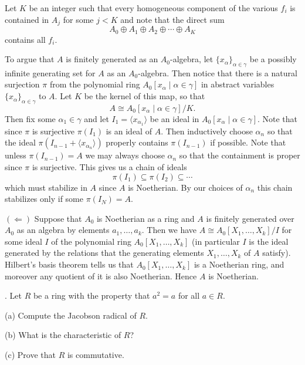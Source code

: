 \documentclass[11pt]{article}
\begin{document}
Let $K$ be an integer such that every homogeneous component of the various $f_i$ is contained in $A_j$ for some $j<K$ and note that the direct sum \[
A_0\oplus A_1\oplus A_2\oplus\cdots \oplus A_K
\]
contains all $f_i$. 


To argue that $A$ is finitely generated as an $A_0$-algebra, let $\{x_\alpha\}_{\alpha \in \gamma}$ be a possibly infinite generating set for $A$ as an $A_0$-algebra. Then notice that there is a natural surjection $\pi$ from the polynomial ring $A_0[x_\alpha \mid \alpha\in \gamma]$ in abstract variables $\{x_\alpha\}_{\alpha\in \gamma}$ to $A$. Let $K$ be the kernel of this map, so that \[
A \cong A_0[x_\alpha\mid \alpha\in \gamma]/ K.
\]
Then fix some $\alpha_1\in \gamma$ and let $I_1 = \langle x_{\alpha_1}\rangle$ be an ideal in $A_0[x_\alpha\mid \alpha\in \gamma]$. Note that since $\pi$ is surjective $\pi(I_1)$ is an ideal of $A$. Then inductively choose $\alpha_n$ so that the ideal $\pi(I_{n-1}+\langle x_{\alpha_n}\rangle)$ properly contains $\pi(I_{n-1})$ if possible. Note that unless $\pi(I_{n-1}) = A$ we may always choose $\alpha_{n}$ so that the containment is proper since $\pi$ is surjective. This gives us a chain of ideals \[
\pi(I_1) \subseteq \pi(I_2)\subseteq \cdots 
\]
which must stabilize in $A$ since $A$ is Noetherian. By our choices of $\alpha_n$ this chain stabilizes only if some $\pi(I_N) = A$. 

$(\Leftarrow)$ Suppose that $A_0$ is Noetherian as a ring and $A$ is finitely generated over $A_0$ as an algebra by elements $a_1,\ldots, a_k$. Then we have $A\cong A_0[X_1,\ldots, X_k]/I$ for some ideal $I$ of the polynomial ring $A_0[X_1,\ldots, X_k]$ (in particular $I$ is the ideal generated by the relations that the generating elements $X_1,\ldots, X_k$ of $A$ satisfy). Hilbert's basis theorem tells us that $A_0[X_1,\ldots, X_k]$ is a Noetherian ring, and moreover any quotient of it is also Noetherian. Hence $A$ is Noetherian. 

 
. Let $R$ be a ring with the property that $a^2 = a$ for all $a\in R$.

(a) Compute the Jacobson radical of $R$.

(b) What is the characteristic of $R$?

(c) Prove that $R$ is commutative.
\end{document}
